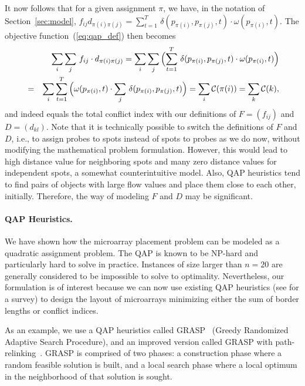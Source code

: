 \documentclass[english]{lni}
\newcommand{\ignore}[1]{}
\begin{document}
It now follows that for a given assignment $\pi$, we have, in the notation of
Section~\ref{sec:model}, 
$f_{ij} d_{\pi(i)\pi(j)} = \sum_{t=1}^T\, \delta(p_{\pi(i)},p_{\pi(j)},t) 
\cdot \omega(p_{\pi(i)},t)$. The objective
function~(\ref{eq:qap_def}) then becomes
\begin{eqnarray*}
  & & \sum_i \sum_j\, f_{ij} \cdot d_{\pi(i)\pi(j)} 
    = \sum_i \sum_j\, \Bigl( \sum_{t=1}^T\,  \delta(p_{\pi(i)},p_{\pi(j)},t)
      \cdot \omega(p_{\pi(i)},t) \Bigr)\\
  &=& \sum_i \sum_{t=1}^T\, \Bigl( \omega(p_{\pi(i)},t)
      \cdot \sum_j\,  \delta(p_{\pi(i)},p_{\pi(j)},t) \Bigr) 
    = \sum_i \mathcal{C}(\pi(i))
    = \sum_k \mathcal{C}(k),\\
\end{eqnarray*}
and indeed equals the total conflict index with our definitions of $F=(f_{ij})$
and $D=(d_{kl})$.
Note that it is technically possible to switch the definitions of $F$
and $D$, i.e., to assign probes to spots instead of spots to probes as we do now, 
without modifying the mathematical problem formulation. 
However, this would lead to high distance value for
neighboring spots and many zero distance values for independent spots, a somewhat
counterintuitive model. Also, QAP heuristics tend to find pairs of objects with
large flow values and place them close to each other, initially. Therefore, the
way of modeling $F$ and $D$ may be significant.

\paragraph{QAP Heuristics.}
We have shown how the microarray placement problem can be modeled as a
quadratic assignment problem.  The QAP is known to be NP-hard and
particularly hard to solve in practice.  Instances of size larger than
$n = 20$ are generally considered to be impossible to solve to
optimality. Nevertheless, our formulation is of interest because we
can now use existing QAP heuristics (see \cite{CELA98} for a survey)
to design the layout of microarrays minimizing either the sum of
border lengths or conflict indices.
\ignore{including approaches based on tabu search, simulated annealing and genetic algorithms}

As an example, we use a QAP heuristics called GRASP~\cite{LI94}
(Greedy Randomized Adaptive Search Procedure), and an improved version
called GRASP with path-relinking~\cite{OLIVEIRA04}.  GRASP is
comprised of two phases: a construction phase where a random feasible
solution is built, and a local search phase where a local optimum in
the neighborhood of that solution is sought.
\end{document}
